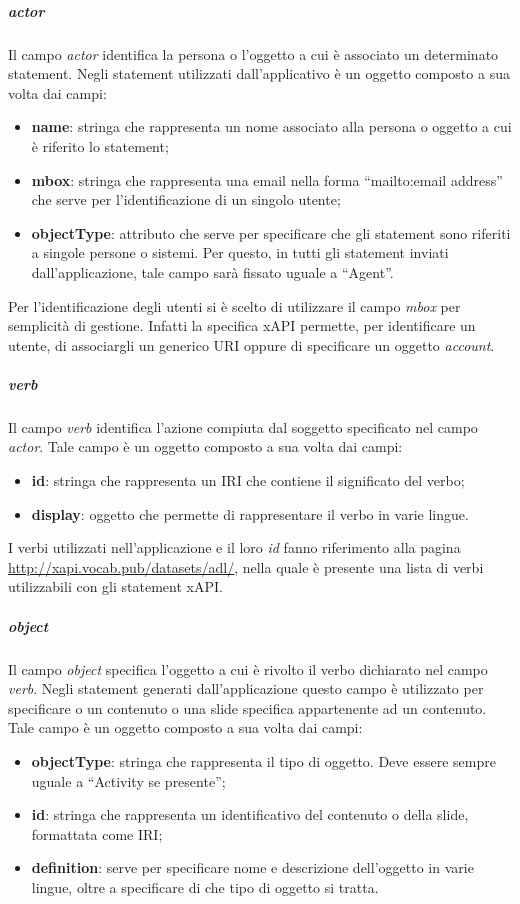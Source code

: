 \documentclass[../Tesi.tex]{subfiles}
\begin{document}
					\subparagraph{actor}
					Il campo \textit{actor} identifica la persona o l'oggetto a cui è associato un determinato statement. Negli statement utilizzati dall'applicativo è un oggetto composto a sua volta dai campi:
					\begin{itemize}
						\item \textbf{name}: stringa che rappresenta un nome associato alla persona o oggetto a cui è riferito lo statement;
						\item \textbf{mbox}: stringa che rappresenta una email nella forma ``mailto:email address'' che serve per l'identificazione di un singolo utente; 
						\item \textbf{objectType}: attributo che serve per specificare che gli statement sono riferiti a singole persone o sistemi. Per questo, in tutti gli statement inviati dall'applicazione, tale campo sarà fissato uguale a ``Agent''.
					\end{itemize}
					Per l'identificazione degli utenti si è scelto di utilizzare il campo \textit{mbox} per semplicità di gestione. Infatti la specifica xAPI permette, per identificare un utente, di associargli un generico URI oppure di specificare un oggetto \textit{account}.

					\subparagraph{verb}
					Il campo \textit{verb} identifica l'azione compiuta dal soggetto specificato nel campo \textit{actor}. Tale campo è un oggetto composto a sua volta dai campi:
					\begin{itemize}
						\item \textbf{id}: stringa che rappresenta un IRI che contiene il significato del verbo;
						\item \textbf{display}: oggetto che permette di rappresentare il verbo in varie lingue.
					\end{itemize}
					I verbi utilizzati nell'applicazione e il loro \textit{id} fanno riferimento alla pagina \url{http://xapi.vocab.pub/datasets/adl/}, nella quale è presente una lista di verbi utilizzabili con gli statement xAPI.

					\subparagraph{object}
					Il campo \textit{object} specifica l'oggetto a cui è rivolto il verbo dichiarato nel campo \textit{verb}. Negli statement generati dall'applicazione questo campo è utilizzato per specificare o un contenuto o una slide specifica appartenente ad un contenuto. Tale campo è un oggetto composto a sua volta dai campi:
					\begin{itemize}
						\item \textbf{objectType}: stringa che rappresenta il tipo di oggetto. Deve essere sempre uguale a ``Activity se presente'';
						\item \textbf{id}: stringa che rappresenta un identificativo del contenuto o della slide, formattata come IRI;
						\item \textbf{definition}: serve per specificare nome e descrizione dell'oggetto in varie lingue, oltre a specificare di che tipo di oggetto si tratta.
					\end{itemize}
\end{document}
